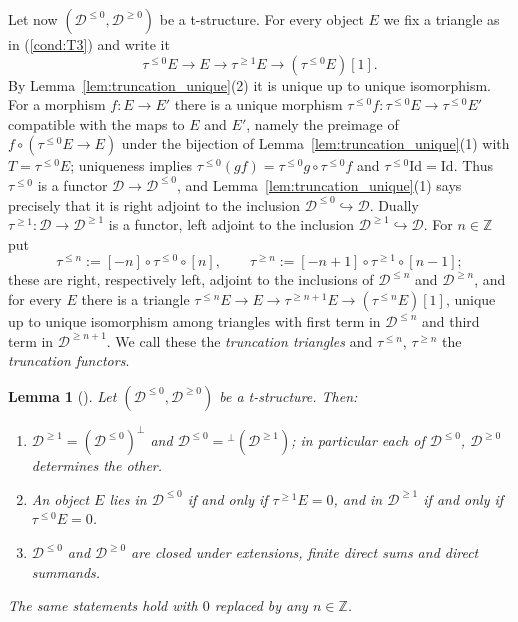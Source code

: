 \documentclass[12pt]{amsart}
\newcommand{\condref}[1]{\textup{(\ref{#1})}}
\newtheorem{lemma}[theorem]{Lemma}
\numberwithin{theorem}{section}
\theoremstyle{definition}
\newcommand{\ZZ}{\mathbb{Z}}
\newcommand{\id}{\mathrm{Id}}
\newcommand{\calD}{\mathcal{D}}
\newcommand{\Dle}[1]{\calD^{\leqslant #1}}
\newcommand{\Dge}[1]{\calD^{\geqslant #1}}
\begin{document}
	Let now $(\Dle{0}, \Dge{0})$ be a t-structure.
	For every object $E$ we fix a triangle as in \condref{cond:T3} and write it
	\begin{equation}
		\label{eq:truncation_triangle}
		\tau^{\leqslant 0} E \to E \to \tau^{\geqslant 1} E \to (\tau^{\leqslant 0} E)[1] .
	\end{equation}
	By Lemma~\ref{lem:truncation_unique}(2) it is unique up to unique isomorphism.
	For a morphism $f \colon E \to E'$ there is a unique morphism $\tau^{\leqslant 0} f \colon \tau^{\leqslant 0} E \to \tau^{\leqslant 0} E'$ compatible with the maps to $E$ and $E'$, namely the preimage of $f \circ (\tau^{\leqslant 0} E \to E)$ under the bijection of Lemma~\ref{lem:truncation_unique}(1) with $T = \tau^{\leqslant 0} E$;
	uniqueness implies $\tau^{\leqslant 0}(g f) = \tau^{\leqslant 0} g \circ \tau^{\leqslant 0} f$ and $\tau^{\leqslant 0} \id = \id$.
	Thus $\tau^{\leqslant 0}$ is a functor $\calD \to \Dle{0}$, and Lemma~\ref{lem:truncation_unique}(1) says precisely that it is right adjoint to the inclusion $\Dle{0} \hookrightarrow \calD$.
	Dually $\tau^{\geqslant 1} \colon \calD \to \Dge{1}$ is a functor, left adjoint to the inclusion $\Dge{1} \hookrightarrow \calD$.
	For $n \in \ZZ$ put
	\[
	\tau^{\leqslant n} := [-n] \circ \tau^{\leqslant 0} \circ [n], \qquad \tau^{\geqslant n} := [-n+1] \circ \tau^{\geqslant 1} \circ [n-1] ;
	\]
	these are right, respectively left, adjoint to the inclusions of $\Dle{n}$ and $\Dge{n}$, and for every $E$ there is a triangle $\tau^{\leqslant n} E \to E \to \tau^{\geqslant n+1} E \to (\tau^{\leqslant n} E)[1]$, unique up to unique isomorphism among triangles with first term in $\Dle{n}$ and third term in $\Dge{n+1}$.
	We call these the \emph{truncation triangles} and $\tau^{\leqslant n}$, $\tau^{\geqslant n}$ the \emph{truncation functors}.
	
	\begin{lemma}[{\cite[1.3.4]{BBD82}}]
		\label{lem:t_orthogonal}
		Let $(\Dle{0}, \Dge{0})$ be a t-structure. Then:
		\begin{enumerate}
			\item $\Dge{1} = (\Dle{0})^{\perp}$ and $\Dle{0} = {}^{\perp}(\Dge{1})$; in particular each of $\Dle{0}$, $\Dge{0}$ determines the other.
			\item An object $E$ lies in $\Dle{0}$ if and only if $\tau^{\geqslant 1} E = 0$, and in $\Dge{1}$ if and only if $\tau^{\leqslant 0} E = 0$.
			\item $\Dle{0}$ and $\Dge{0}$ are closed under extensions, finite direct sums and direct summands.
		\end{enumerate}
		The same statements hold with $0$ replaced by any $n \in \ZZ$.
	\end{lemma}
	
\end{document}
